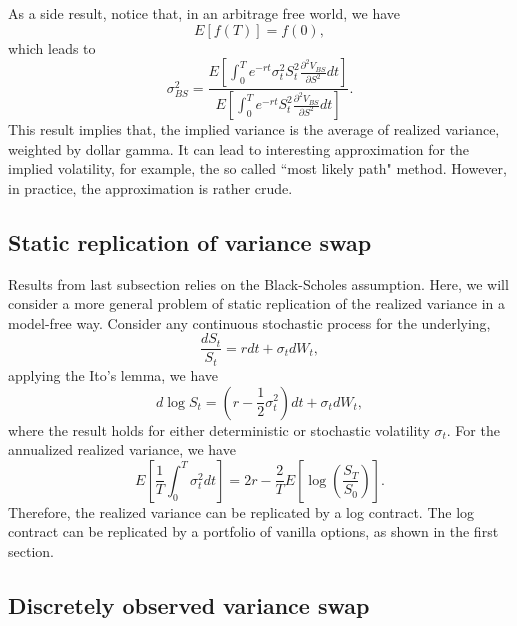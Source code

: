 \documentclass[12pt]{article}
\begin{document}
    As a side result, notice that, in an arbitrage free world, we have
    \begin{equation}
      E\left[f(T)\right]=f(0),
    \end{equation}
    which leads to
    \begin{equation}
      \sigma_{BS}^2=\frac{\displaystyle E\left[\int_0^Te^{-rt}\sigma_t^2S_t^2\frac{\partial^2 V_{BS}}{\partial S^2}dt\right]}
                         {\displaystyle E\left[\int_0^Te^{-rt}S_t^2\frac{\partial^2 V_{BS}}{\partial S^2}dt\right]}.
    \end{equation}
    This result implies that, the implied variance is the average of realized variance, weighted by dollar gamma. It can lead to interesting approximation for the implied
    volatility, for example, the so called ``most likely path" method. However, in practice, the approximation is rather crude.

  \subsection{Static replication of variance swap}

    Results from last subsection relies on the Black-Scholes assumption. Here, we will consider a more general problem of static replication of the realized variance in a model-free way.
    Consider any continuous stochastic process for the underlying,
    \begin{equation}
      \frac{dS_t}{S_t}=rdt+\sigma_tdW_t,
    \end{equation}
    applying the Ito's lemma, we have
    \begin{equation}
      d\log S_t = \left(r-\frac{1}{2}\sigma_t^2\right)dt+\sigma_tdW_t,
    \end{equation}
    where the result holds for either deterministic or stochastic volatility $\sigma_t$. For the annualized realized variance, we have
    \begin{equation}
      E\left[\frac{1}{T}\int_0^T\sigma_t^2dt\right]= 2r - \frac{2}{T}E\left[\log\left(\frac{S_T}{S_0}\right)\right].
    \end{equation}
    Therefore, the realized variance can be replicated by a log contract. The log contract can be replicated by a portfolio of vanilla options, as shown in the first
    section.


  \subsection{Discretely observed variance swap}
\end{document}
